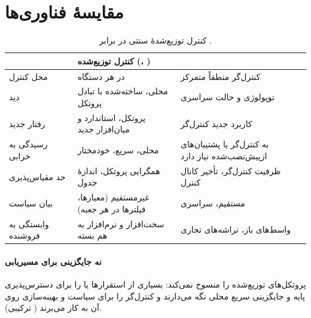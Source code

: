 \documentclass[11pt,a4paper]{article}
\begin{document}
\section{مقایسهٔ فناوری‌ها}
\begin{table}[htbp]
\centering\small
\caption{کنترل توزیع‌شدهٔ سنتی در برابر .}\label{tab:cmp}
\begin{tabularx}{\linewidth}{@{}l Y Y@{}}
\toprule
{} & کنترل توزیع‌شده (، ) &  \\
\midrule
محل کنترل        & در هر دستگاه                          & کنترل‌گر منطقاً متمرکز \\
دید              & محلی، ساخته‌شده با تبادل پروتکل        & توپولوژی و حالت سراسری \\
رفتار جدید       & پروتکل، استاندارد و میان‌افزار جدید    & کاربرد جدید کنترل‌گر \\
رسیدگی به خرابی  & محلی، سریع، خودمختار                  & به کنترل‌گر یا پشتیبان‌های ازپیش‌نصب‌شده نیاز دارد \\
حد مقیاس‌پذیری   & همگرایی پروتکل، اندازهٔ جدول           & ظرفیت کنترل‌گر، تأخیر کانال کنترل \\
بیان سیاست       & غیرمستقیم (معیارها، فیلترها در هر جعبه) & مستقیم، سراسری \\
وابستگی به فروشنده & سخت‌افزار و نرم‌افزار به هم بسته      & واسط‌های باز، تراشه‌های تجاری \\
\bottomrule
\end{tabularx}
\end{table}

\paragraph{نه جایگزینی برای مسیریابی}  پروتکل‌های توزیع‌شده را منسوخ نمی‌کند: بسیاری از استقرارها  یا
 را برای دسترس‌پذیری پایه و جایگزینی سریع محلی نگه می‌دارند و کنترل‌گر را برای سیاست و بهینه‌سازی روی آن به کار
می‌برند ( ترکیبی).

\end{document}
